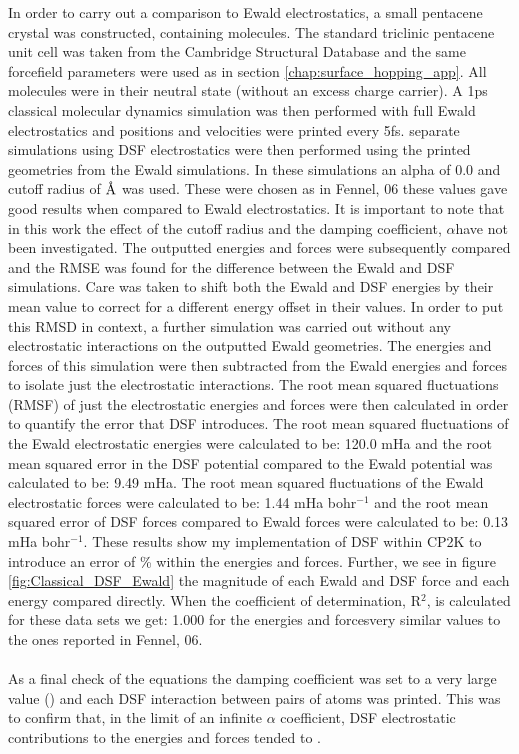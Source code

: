 In order to carry out a comparison to Ewald electrostatics, a small pentacene crystal was constructed, containing  molecules. The standard triclinic pentacene unit cell was taken from the Cambridge Structural Database \cite{CSD} and the same forcefield parameters were used as in section \ref{chap:surface_hopping_app}. All molecules were in their neutral state (without an excess charge carrier). A 1ps classical molecular dynamics simulation was then performed with full Ewald electrostatics and positions and velocities were printed every 5fs.  separate simulations using DSF electrostatics were then performed using the printed geometries from the Ewald simulations. In these simulations an alpha of 0.0 and cutoff radius of $\text{\normalfont\AA}$ was used. These were chosen as in Fennel, 06 \cite{DSF} these values gave good results when compared to Ewald electrostatics. It is important to note that in this work the effect of the cutoff radius and the damping coefficient, $\alpha$\madd{, }have not been investigated. The outputted energies and forces were subsequently compared and the RMSE was found for the difference between the Ewald and DSF simulations. Care was taken to shift both the Ewald and DSF energies by their mean value to correct for a different energy offset in their values. In order to put this RMSD in context, a further simulation was carried out without any electrostatic interactions on the outputted Ewald geometries. The energies and forces of this simulation were then subtracted from the Ewald energies and forces to isolate just the electrostatic interactions. The root mean squared fluctuations (RMSF) of just the electrostatic energies and forces were then calculated in order to quantify the error that DSF introduces. The root mean squared fluctuations of the Ewald electrostatic energies were calculated to be: 120.0 mHa and the root mean squared error in the DSF potential compared to the Ewald potential was calculated to be: 9.49 mHa. The root mean squared fluctuations of the Ewald electrostatic forces were calculated to be: 1.44 mHa bohr$^{-1}$ and the root mean squared error of DSF forces compared to Ewald forces were calculated to be: 0.13 mHa bohr$^{-1}$. These results show my implementation of DSF within CP2K to introduce an error of \% within the energies and forces. Further, we see in figure \ref{fig:Classical_DSF_Ewald} the magnitude of each Ewald and DSF force and each energy compared directly. When the coefficient of determination, R$^2$, is calculated for these data sets we get: 1.000 for the energies and forces\replace{ -}{, }very similar values to the ones reported in Fennel, 06.
\\\\
As a final check of the equations the damping coefficient was set to a very large value () and each DSF interaction between pairs of atoms was printed. This was to confirm that, in the limit of an infinite $\alpha$ coefficient, DSF electrostatic contributions to the energies and forces tended to . 

